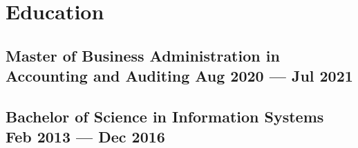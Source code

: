 \section{Education}

\subsection{Master of Business Administration in Accounting and Auditing \hfill Aug 2020 --- Jul 2021}

\vspace{1.2em}

\subsection{Bachelor of Science in Information Systems \hfill Feb 2013 --- Dec 2016}

